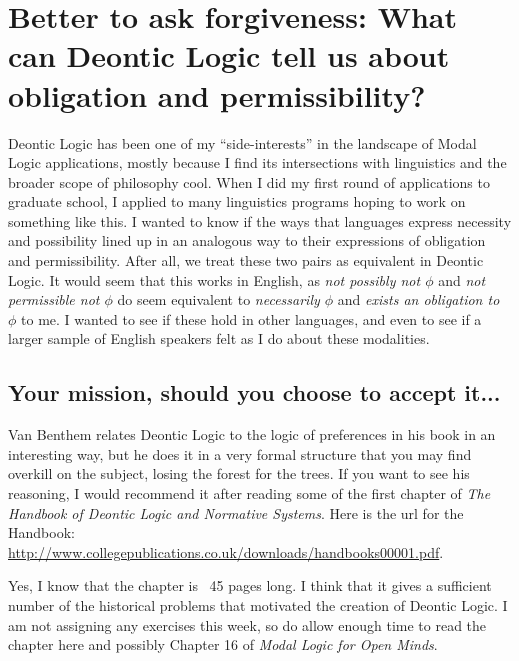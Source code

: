 \chapter[Week of Deontic Logic]{Better to ask forgiveness: What can Deontic Logic tell us about obligation and permissibility?}

Deontic Logic has been one of my ``side-interests'' in the landscape of Modal Logic applications, mostly because I find
its intersections with linguistics and the broader scope of philosophy cool. When I did my first round of applications to
graduate school, I applied to many linguistics programs hoping to work on something like this. I wanted to know if the
ways that languages express necessity and possibility lined up in an analogous way to their expressions of obligation
and permissibility. After all, we treat these two pairs as equivalent in Deontic Logic. It would seem that this works
in English, as \emph{not possibly not $\phi$} and \emph{not permissible not $\phi$} do seem equivalent to
\emph{necessarily $\phi$} and \emph{exists an obligation to $\phi$} to me. I wanted to see if these hold in other languages, and
even to see if a larger sample of English speakers felt as I do about these modalities.

\setcounter{section}{-1}

\section{Your mission, should you choose to accept it...}

Van Benthem relates Deontic Logic to the logic of preferences in his book in an interesting way, but he does it in a very
formal structure that you may find overkill on the subject, losing the forest for the trees. If you want to see his
reasoning, I would recommend it after reading some of the first chapter of \emph{The Handbook of Deontic Logic and Normative
Systems}. Here is the url for the Handbook: \url{http://www.collegepublications.co.uk/downloads/handbooks00001.pdf}.

\bigskip

Yes, I know that the chapter is ~45 pages long. I think that it gives a sufficient number of the historical problems
that motivated the creation of Deontic Logic. I am not assigning any exercises this week, so do allow enough time to read
the chapter here and possibly Chapter 16 of \emph{Modal Logic for Open Minds}.